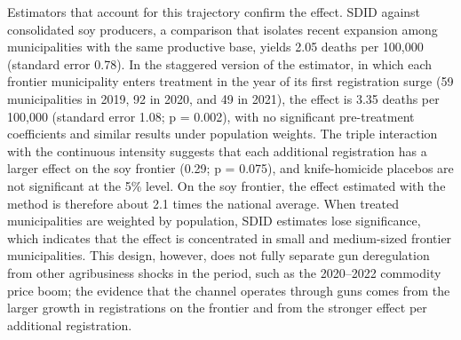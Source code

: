 \documentclass[11pt,a4paper]{article}
\begin{document}
Estimators that account for this trajectory confirm the effect. SDID against consolidated soy producers, a comparison that isolates recent expansion among municipalities with the same productive base, yields 2.05 deaths per 100,000 (standard error 0.78). In the staggered version of the \citet{callaway2021} estimator, in which each frontier municipality enters treatment in the year of its first registration surge (59 municipalities in 2019, 92 in 2020, and 49 in 2021), the effect is 3.35 deaths per 100,000 (standard error 1.08; p = 0.002), with no significant pre-treatment coefficients and similar results under population weights. The triple interaction with the continuous intensity suggests that each additional registration has a larger effect on the soy frontier (0.29; p = 0.075), and knife-homicide placebos are not significant at the 5\% level. On the soy frontier, the effect estimated with the \citet{callaway2021} method is therefore about 2.1 times the national average. When treated municipalities are weighted by population, SDID estimates lose significance, which indicates that the effect is concentrated in small and medium-sized frontier municipalities. This design, however, does not fully separate gun deregulation from other agribusiness shocks in the period, such as the 2020--2022 commodity price boom; the evidence that the channel operates through guns comes from the larger growth in registrations on the frontier and from the stronger effect per additional registration.
\end{document}
